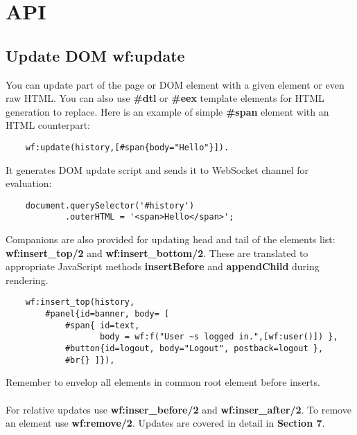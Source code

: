 \section{API}

\subsection{Update DOM \bf{wf:update}}
You can update part of the page or DOM element with a given
element or even raw HTML. You can also use {\bf \#dtl}
or {\bf \#eex} template elements for HTML generation to
replace. Here is an example of simple {\bf \#span} element
with an HTML counterpart:

\vspace{1\baselineskip}
\begin{lstlisting}
    wf:update(history,[#span{body="Hello"}]).
\end{lstlisting}
\vspace{1\baselineskip}

It generates DOM update script and sends it to
WebSocket channel for evaluation:

\vspace{1\baselineskip}
\begin{lstlisting}
    document.querySelector('#history')
            .outerHTML = '<span>Hello</span>';
\end{lstlisting}
\vspace{1\baselineskip}

Companions are also provided for updating head and tail
of the elements list: {\bf wf:insert\_top/2} and
{\bf wf:insert\_bottom/2}. These are translated to appropriate
JavaScript methods {\bf insertBefore} and {\bf appendChild} during rendering.

\vspace{1\baselineskip}
\begin{lstlisting}
    wf:insert_top(history,
        #panel{id=banner, body= [
            #span{ id=text, 
                   body = wf:f("User ~s logged in.",[wf:user()]) },
            #button{id=logout, body="Logout", postback=logout }, 
            #br{} ]}),
\end{lstlisting}
\vspace{1\baselineskip}

Remember to envelop all elements in common root element before inserts.

\paragraph{}
For relative updates use {\bf wf:inser\_before/2} and {\bf wf:inser\_after/2}.
To remove an element use {\bf wf:remove/2}.
Updates are covered in detail in {\bf Section 7}.

